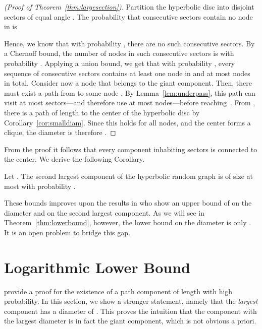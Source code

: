 \documentclass{llncs}
\newcommand{\thmref}[1]{Theorem~\ref{thm:#1}}
\newcommand{\lemref}[1]{Lemma~\ref{lem:#1}}
\newcommand{\corref}[1]{Corollary~\ref{cor:#1}}
\begin{document}
\begin{proof}[(Proof of \thmref{largesection})]
Partition the hyperbolic disc into  disjoint sectors of equal angle . The probability that  consecutive sectors contain no node in  is

Hence, we know that with probability , there are no  such consecutive sectors. By a Chernoff bound, the number of nodes in  such consecutive sectors is  with probability . Applying a union bound, we get that with probability , every sequence of  consecutive sectors contains at least one node in  and at most  nodes in total. Consider now a node  that belongs to the giant component. Then, there must exist a path from  to some node . By \lemref{underpass}, this path can visit at most  sectors---and therefore use at most  nodes---before reaching~. From , there is a path of length  to the center  of the hyperbolic disc by \corref{smalldiam}. Since this holds for all nodes, and the center forms a clique, the diameter is therefore .
\end{proof}
From the proof it follows that every component inhabiting  sectors is connected to the center. We derive the following Corollary.
\begin{corollary}
\label{cor:2ndcomp}
Let . The second largest component of the hyperbolic random graph is of size at most  with probability .
\end{corollary}
These bounds improves upon the results in \cite{KiwiMitsche15} who show an upper bound of  on the diameter and  on the second largest component.
As we will see in \thmref{lowerbound}, however, the lower bound on the diameter is only . It is an open problem to bridge this gap.









\section{Logarithmic Lower Bound}
\label{sec:lower}

\citet{KiwiMitsche15} provide a proof for the existence of a path component of length  with high probability. In this section, we show a stronger statement, namely that the {\em largest} component has a diameter of . This proves the intuition that the component with the largest diameter is in fact the giant component, which is not obvious a priori. 
\end{document}
